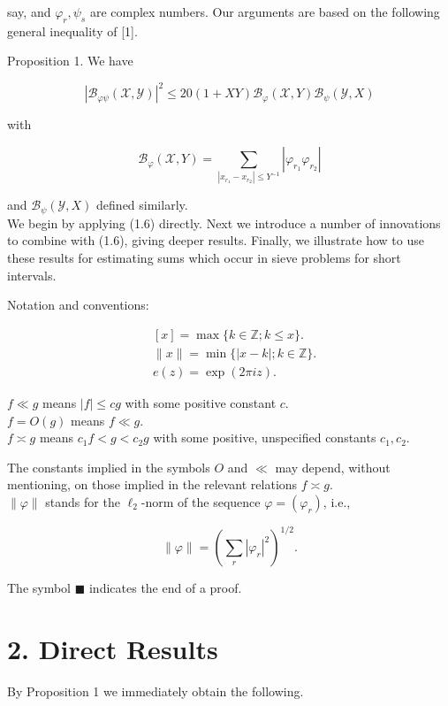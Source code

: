 \documentclass[10pt]{article}
\begin{document}
say, and $\varphi_{r}, \psi_{s}$ are complex numbers. Our arguments are based on the following general inequality of [1].

Proposition 1. We have


\begin{equation*}
\left|\mathscr{B}_{\varphi \psi}(\mathscr{X}, \mathscr{Y})\right|^{2} \leqslant 20(1+X Y) \mathscr{B}_{\varphi}(\mathscr{X}, Y) \mathscr{B}_{\psi}(\mathscr{Y}, X) \tag{1.6}
\end{equation*}


with

$$
\mathscr{B}_{\varphi}(\mathscr{X}, Y)=\sum_{\left|x_{r_{1}}-x_{r_{2}}\right| \leqslant Y^{-1}}\left|\varphi_{r_{1}} \varphi_{r_{2}}\right|
$$

and $\mathscr{B}_{\psi}(\mathscr{Y}, X)$ defined similarly.\\
We begin by applying (1.6) directly. Next we introduce a number of innovations to combine with (1.6), giving deeper results. Finally, we illustrate how to use these results for estimating sums which occur in sieve problems for short intervals.

Notation and conventions:

$$
\begin{aligned}
& {[x]=\max \{k \in \mathbb{Z} ; k \leqslant x\} .} \\
& \|x\|=\min \{|x-k| ; k \in \mathbb{Z}\} . \\
& e(z)=\exp (2 \pi i z) .
\end{aligned}
$$

$f \ll g$ means $|f| \leqslant c g$ with some positive constant $c$.\\
$f=O(g)$ means $f \ll g$.\\
$f \asymp g$ means $c_{1} f<g<c_{2} g$ with some positive, unspecified constants $c_{1}, c_{2}$.

The constants implied in the symbols $O$ and $\ll$ may depend, without mentioning, on those implied in the relevant relations $f \asymp g$.\\
$\|\varphi\|$ stands for the $\ell_{2}$-norm of the sequence $\varphi=\left(\varphi_{r}\right)$, i.e.,

$$
\|\varphi\|=\left(\sum_{r}\left|\varphi_{r}\right|^{2}\right)^{1 / 2} .
$$

The symbol $\blacksquare$ indicates the end of a proof.

\section*{2. Direct Results}
By Proposition 1 we immediately obtain the following.
\end{document}
